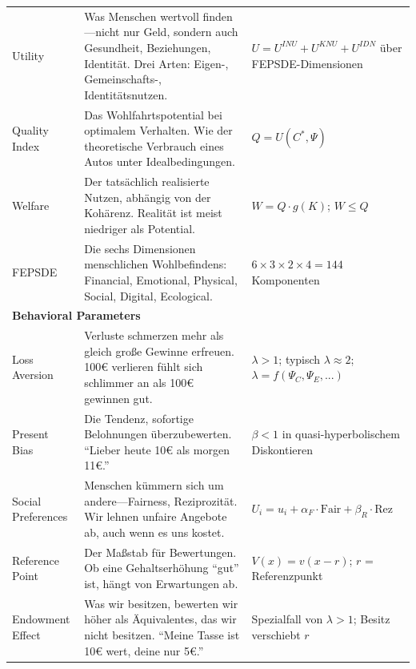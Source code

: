 \begin{center}
\begin{longtable}{@{}p{2.5cm}p{5.2cm}p{5.2cm}@{}}
Utility &
Was Menschen wertvoll finden---nicht nur Geld, sondern auch Gesundheit, Beziehungen, Identität. Drei Arten: Eigen-, Gemeinschafts-, Identitätsnutzen. &
$U = U^{INU} + U^{KNU} + U^{IDN}$ \newline über FEPSDE-Dimensionen \\

Quality Index &
Das Wohlfahrtspotential bei optimalem Verhalten. Wie der theoretische Verbrauch eines Autos unter Idealbedingungen. &
$Q = U(C^*, \Psi)$ \\

Welfare &
Der tatsächlich realisierte Nutzen, abhängig von der Kohärenz. Realität ist meist niedriger als Potential. &
$W = Q \cdot g(K)$; \newline $W \leq Q$ \\

FEPSDE &
Die sechs Dimensionen menschlichen Wohlbefindens: Financial, Emotional, Physical, Social, Digital, Ecological. &
$6 \times 3 \times 2 \times 4 = 144$ Komponenten \\

\midrule
\multicolumn{3}{l}{\cellcolor{yellow!10}\textbf{Behavioral Parameters}} \\
\midrule

Loss Aversion &
Verluste schmerzen mehr als gleich große Gewinne erfreuen. 100€ verlieren fühlt sich schlimmer an als 100€ gewinnen gut. &
$\lambda > 1$; typisch $\lambda \approx 2$; \newline $\lambda = f(\Psi_C, \Psi_E, ...)$ \\

Present Bias &
Die Tendenz, sofortige Belohnungen überzubewerten. ``Lieber heute 10€ als morgen 11€.'' &
$\beta < 1$ in quasi-hyperbolischem Diskontieren \\

Social Preferences &
Menschen kümmern sich um andere---Fairness, Reziprozität. Wir lehnen unfaire Angebote ab, auch wenn es uns kostet. &
$U_i = u_i + \alpha_F \cdot \text{Fair} + \beta_R \cdot \text{Rez}$ \\

Reference Point &
Der Maßstab für Bewertungen. Ob eine Gehaltserhöhung ``gut'' ist, hängt von Erwartungen ab. &
$V(x) = v(x - r)$; \newline $r$ = Referenzpunkt \\

Endowment Effect &
Was wir besitzen, bewerten wir höher als Äquivalentes, das wir nicht besitzen. ``Meine Tasse ist 10€ wert, deine nur 5€.'' &
Spezialfall von $\lambda > 1$; \newline Besitz verschiebt $r$ \\


\end{longtable}
\end{center}
